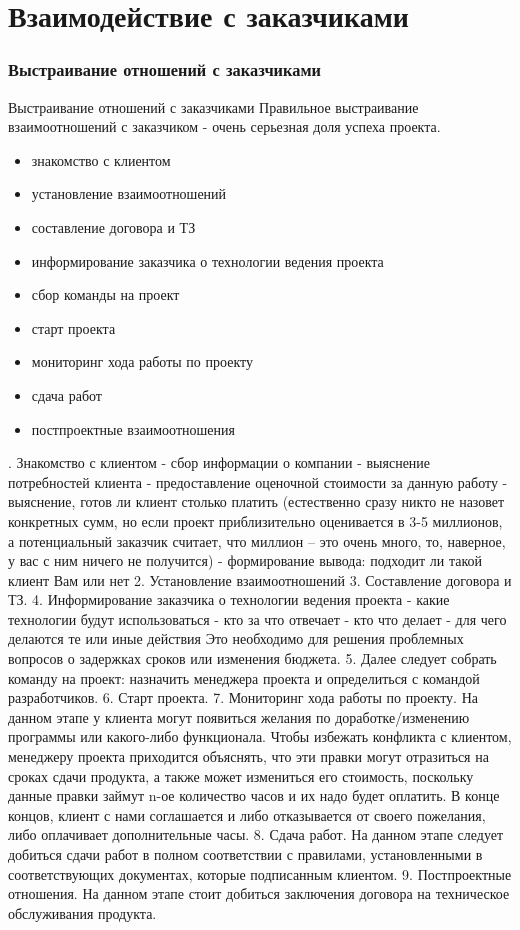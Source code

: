 \documentclass{industrial-development}
\begin{document}
\section{Взаимодействие с заказчиками}

\begin{frame} \frametitle{Выстраивание отношений с заказчиками}
  \begin{block}{Выстраивание отношений с заказчиками}
Правильное выстраивание взаимоотношений с заказчиком - очень серьезная доля успеха проекта. 
  \end{block}

\begin{itemize}
 \item знакомство с клиентом
 \item установление взаимоотношений
 \item составление договора и ТЗ
 \item информирование заказчика о технологии ведения проекта
 \item сбор команды на проект 
 \item старт проекта 
 \item мониторинг хода работы по проекту
 \item сдача работ
 \item постпроектные взаимоотношения
  \end{itemize}
\end{frame}

. Знакомство с клиентом
  - сбор информации о компании
  -  выяснение потребностей клиента
  - предоставление оценочной стоимости за данную работу
 -  выяснение, готов ли клиент столько платить (естественно сразу никто не назовет конкретных сумм, но если проект приблизительно оценивается в 3-5 миллионов, а потенциальный заказчик считает, что миллион –  это очень много, то, наверное, у вас с ним ничего не получится)
  - формирование вывода: подходит ли такой клиент Вам или нет
2. Установление взаимоотношений
3. Составление договора и ТЗ.
4. Информирование заказчика о технологии ведения проекта
 - какие технологии будут использоваться
 - кто за что отвечает
 - кто что делает
 - для чего делаются те или иные действия
 Это необходимо для решения проблемных вопросов о задержках сроков или изменения бюджета.
5. Далее следует собрать команду на проект: назначить менеджера проекта и определиться с командой разработчиков.
6. Старт проекта.
7. Мониторинг хода работы по проекту. 
На данном этапе у клиента могут появиться желания по доработке/изменению программы или какого-либо функционала. Чтобы избежать конфликта с клиентом, менеджеру проекта приходится объяснять, что эти правки могут отразиться на сроках сдачи продукта, а также может измениться его стоимость, поскольку данные правки займут n-ое количество часов и их надо будет оплатить. В конце концов, клиент с нами соглашается и либо отказывается от своего пожелания, либо оплачивает дополнительные часы. 
8. Сдача работ.
На данном этапе следует добиться сдачи работ в полном соответствии с правилами, установленными в соответствующих документах, которые подписанным клиентом.
9. Постпроектные отношения. 
На данном этапе стоит добиться заключения договора на техническое обслуживания продукта.
\end{document}
